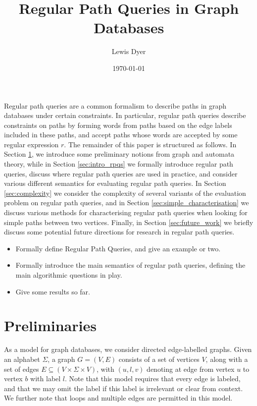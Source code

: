 \documentclass{article}
\title{Regular Path Queries in Graph Databases}
\date{\today}
\author{Lewis Dyer}
\begin{document}
\maketitle

Regular path queries are a common formalism to describe paths in graph databases under certain constraints. In particular, regular path queries describe constraints on paths by forming words from paths based on the edge labels included in these paths, and accept paths whose words are accepted by some regular expression $r$. The remainder of this paper is structured as follows. In Section \ref{sec:prelims}, we introduce some preliminary notions from graph and automata theory, while in Section \ref{sec:intro_rpqs} we formally introduce regular path queries, discuss where regular path queries are used in practice, and consider various different semantics for evaluating regular path queries. In Section \ref{sec:complexity} we consider the complexity of several variants of the evaluation problem on regular path queries, and in Section \ref{sec:simple_characterisation} we discuss various methods for characterising regular path queries when looking for simple paths between two vertices. Finally, in Section \ref{sec:future_work} we briefly discuss some potential future directions for research in regular path queries.

\begin{itemize}
    \item Formally define Regular Path Queries, and give an example or two.
    \item Formally introduce the main semantics of regular path queries, defining the main algorithmic questions in play.
    \item Give some results so far.
\end{itemize}

\section{Preliminaries}
\label{sec:prelims}

As a model for graph databases, we consider directed edge-labelled graphs. Given an alphabet $\Sigma$, a graph $G = (V,E)$ consists of a set of vertices $V$, along with a set of edges $E \subseteq (V \times \Sigma \times V)$, with $(u, l, v)$ denoting at edge from vertex $u$ to vertex $b$ with label $l$. Note that this model requires that every edge is labeled, and that we may omit the label if this label is irrelevant or clear from context. We further note that loops and multiple edges are permitted in this model.
\end{document}
